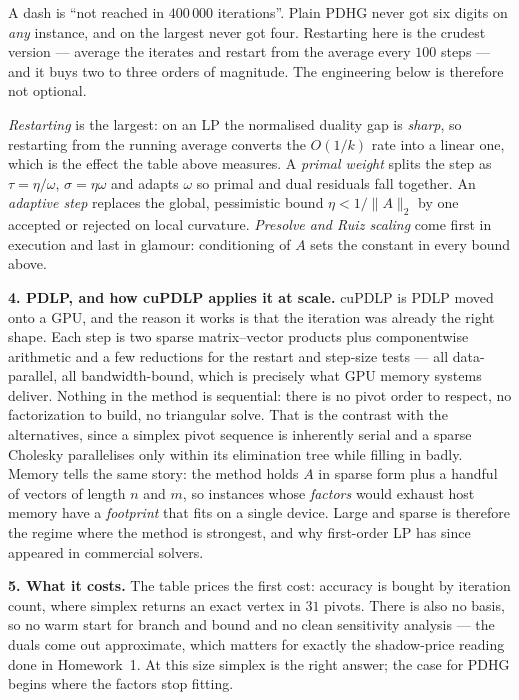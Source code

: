 \documentclass[10pt]{article}
\begin{document}
A dash is ``not reached in $400\,000$ iterations''. Plain PDHG never
got six digits on \emph{any} instance, and on the largest never got
four. Restarting here is the crudest version --- average the iterates
and restart from the average every $100$ steps --- and it buys two to
three orders of magnitude. The engineering below is therefore not
optional.

\emph{Restarting} is the largest: on an LP the normalised duality gap
is \emph{sharp}, so restarting from the running average converts the
$O(1/k)$ rate into a linear one, which is the effect the table above
measures. A \emph{primal weight} splits the step as $\tau = \eta/\omega$,
$\sigma = \eta\omega$ and adapts $\omega$ so primal and dual residuals
fall together. An \emph{adaptive step} replaces the global, pessimistic
bound $\eta < 1/\|A\|_2$ by one accepted or rejected on local
curvature. \emph{Presolve and Ruiz scaling} come first in execution and
last in glamour: conditioning of $A$ sets the constant in every bound
above.

\textbf{4. PDLP, and how cuPDLP applies it at scale.}
cuPDLP is PDLP moved onto a GPU, and the reason it works is that the
iteration was already the right shape. Each step is two sparse
matrix--vector products plus componentwise arithmetic and a few
reductions for the restart and step-size tests --- all data-parallel,
all bandwidth-bound, which is precisely what GPU memory systems
deliver. Nothing in the method is sequential: there is no pivot order
to respect, no factorization to build, no triangular solve. That is
the contrast with the alternatives, since a simplex pivot sequence is
inherently serial and a sparse Cholesky parallelises only within its
elimination tree while filling in badly. Memory tells the same story:
the method holds $A$ in sparse form plus a handful of vectors of
length $n$ and $m$, so instances whose \emph{factors} would exhaust
host memory have a \emph{footprint} that fits on a single device.
Large and sparse is therefore the regime where the method is
strongest, and why first-order LP has since appeared in commercial
solvers.

\textbf{5. What it costs.}
The table prices the first cost: accuracy is bought by iteration
count, where simplex returns an exact vertex in $31$ pivots. There is
also no basis, so no warm start for branch and bound and no clean
sensitivity analysis --- the duals come out approximate, which matters
for exactly the shadow-price reading done in Homework~1. At this size
simplex is the right answer; the case for PDHG begins where the
factors stop fitting.
\end{document}
